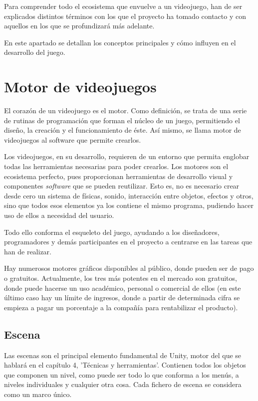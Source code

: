  \label{cap:conceptos}
Para comprender todo el ecosistema que envuelve a un videojuego, han de ser explicados distintos términos con los que el proyecto ha tomado contacto y con aquellos en los que se profundizará más adelante.

En este apartado se detallan los conceptos principales y cómo influyen en el desarrollo del juego.

\section{Motor de videojuegos}

El corazón de un videojuego es el motor. Como definición, se trata de una serie de rutinas de programación que forman el núcleo de un juego, permitiendo el diseño, la creación y el funcionamiento de éste. Así mismo, se llama motor de videojuegos al software que permite crearlos.

Los videojuegos, en su desarrollo, requieren de un entorno que permita englobar todas las herramientas necesarias para poder crearlos. Los motores son el ecosistema perfecto, pues proporcionan herramientas de desarrollo visual y componentes \textit{software} que se pueden reutilizar. Esto es, no es necesario crear desde cero un sistema de físicas, sonido, interacción entre objetos, efectos y otros, sino que todos esos elementos ya los contiene el mismo programa, pudiendo hacer uso de ellos a necesidad del usuario. 

Todo ello conforma el esqueleto del juego, ayudando a los diseñadores, programadores y demás participantes en el proyecto a centrarse en las tareas que han de realizar.

Hay numerosos motores gráficos disponibles al público, donde pueden ser de pago o gratuitos. Actualmente, los tres más potentes en el mercado son gratuitos, donde puede hacerse un uso académico, personal o comercial de ellos (en este último caso hay un límite de ingresos, donde a partir de determinada cifra se empieza a pagar un porcentaje a la compañía para rentabilizar el producto).

\subsection{Escena}

Las escenas son el principal elemento fundamental de Unity, motor del que se hablará en el capítulo 4, 'Técnicas y herramientas'. Contienen todos los objetos que componen un nivel, como puede ser todo lo que conforma a los menús, a niveles individuales y cualquier otra cosa. Cada fichero de escena se considera como un marco único.

